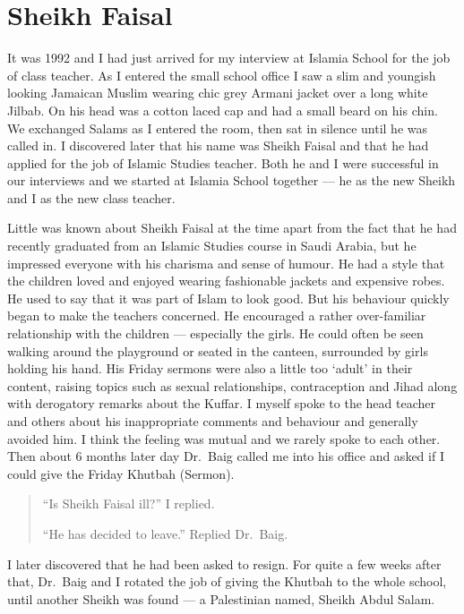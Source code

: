 \documentclass[12pt]{memoir}
\begin{document}
\chapter{Sheikh Faisal}

It was 1992 and I had just arrived for my interview at Islamia School
for the job of class teacher.
As I entered the small school office I saw a slim and youngish looking
Jamaican Muslim wearing chic grey Armani jacket over a long white Jilbab.
On his head was a cotton laced cap and had a small beard on his chin.
We exchanged Salams as I entered the room,
then sat in silence until he was called in.
I discovered later that his name was Sheikh Faisal
and that he had applied for the job of Islamic Studies teacher.
Both he and I were successful in our interviews
and we started at Islamia School together —
he as the new Sheikh and I as the new class teacher.

Little was known about Sheikh Faisal at the time apart from the fact
that he had recently graduated from an Islamic Studies course in Saudi Arabia,
but he impressed everyone with his charisma and sense of humour.
He had a style that the children loved and enjoyed
wearing fashionable jackets and expensive robes.
He used to say that it was part of Islam to look good.
But his behaviour quickly began to make the teachers concerned.
He encouraged a rather over-familiar relationship with the children —
especially the girls.
He could often be seen walking around the playground or seated in the canteen,
surrounded by girls holding his hand.
His Friday sermons were also a little too ‘adult’ in their content,
raising topics such as sexual relationships,
contraception and Jihad along with derogatory remarks about the Kuffar.
I myself spoke to the head teacher and others
about his inappropriate comments and behaviour and generally avoided him.
I think the feeling was mutual and we rarely spoke to each other.
Then about 6 months later day Dr.\ Baig called me into his office
and asked if I could give the Friday Khutbah (Sermon).

\begin{quote}
“Is Sheikh Faisal ill?” I replied.

“He has decided to leave.” Replied Dr.\ Baig.
\end{quote}

I later discovered that he had been asked to resign.
For quite a few weeks after that, Dr.\ Baig and I rotated the job
of giving the Khutbah to the whole school,
until another Sheikh was found — a Palestinian named, Sheikh Abdul Salam.
\end{document}
